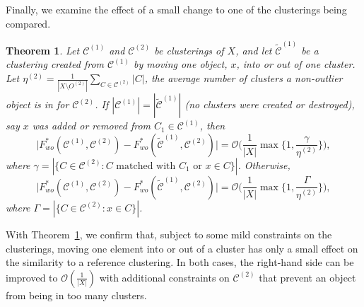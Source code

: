 \documentclass[review,los,12pt]{ryethesis}
\newtheorem{theorem}{Theorem}
\newcommand\cCone{\mathcal{C}^{(1)}}
\newcommand\tcCone{\tilde{\mathcal{C}}^{(1)}}
\newcommand\cCtwo{\mathcal{C}^{(2)}}
\newcommand{\bigO}{\mathcal{O}}
\begin{document}
Finally, we examine the effect of a small change to one of the clusterings being compared.
\begin{theorem}\label{thm:robust}
    Let $\cCone$ and $\cCtwo$ be clusterings of $X$, and let $\tcCone$ be a clustering created from $\cCone$ by moving one object, $x$, into or out of one cluster.
    Let $\eta^{(2)} = \frac{1}{|X \setminus O^{(2)}|} \sum_{C \in \cCtwo} |C|$, the average number of clusters a non-outlier object is in for $\cCtwo$.
    If $|\cCone| = |\tcCone|$ (no clusters were created or destroyed), say $x$ was added or removed from $C_1 \in \cCone$, then
    \begin{equation*}
        \Big| F^*_{wo}(\cCone, \cCtwo) - F^*_{wo}(\tcCone, \cCtwo)\Big| = \bigO \Big( \frac{1}{|X|} \max \Big\{ 1, \frac{\gamma}{\eta^{(2)}} \Big\} \Big),
    \end{equation*}
    where $\gamma = |\{C \in \cCtwo : C \text{ matched with } C_1 \text{ or } x \in C\}|$. 
    Otherwise, 
    \begin{equation*}
        \Big| F^*_{wo}(\cCone, \cCtwo) - F^*_{wo}(\tcCone, \cCtwo) \Big| = \bigO \Big( \frac{1}{|X|} \max \Big\{ 1, \frac{\Gamma}{\eta^{(2)}} \Big\} \Big),
    \end{equation*}
    where $\Gamma = |\{C \in \cCtwo : x \in C\}|$.
\end{theorem}
With Theorem~\ref{thm:robust}, we confirm that, subject to some mild constraints on the clusterings, moving one element into or out of a cluster has only a small effect on the similarity to a reference clustering.
In both cases, the right-hand side can be improved to $\bigO(\frac{1}{|X|})$ with additional constraints on $\cCtwo$ that prevent an object from being in too many clusters.
\end{document}
